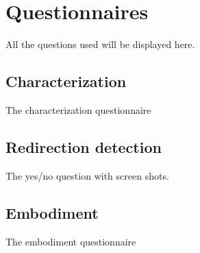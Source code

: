 
\chapter{Questionnaires} %

\label{AppendixA} %

All the questions used will be displayed here.

\section{Characterization}

The characterization questionnaire

\section{Redirection detection}

The yes/no question with screen shots.

\section{Embodiment}

The embodiment questionnaire
